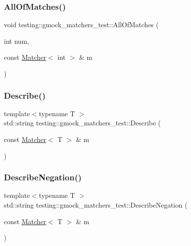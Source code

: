 \subsubsection{\texorpdfstring{AllOfMatches()}{AllOfMatches()}}
{\footnotesize\ttfamily void testing\+::gmock\+\_\+matchers\+\_\+test\+::\+All\+Of\+Matches (\begin{DoxyParamCaption}\item[{int}]{num,  }\item[{const \mbox{\hyperlink{classtesting_1_1_matcher}{Matcher}}$<$ int $>$ \&}]{m }\end{DoxyParamCaption})}

\mbox{\label{namespacetesting_1_1gmock__matchers__test_a738a538e1705ea49670aeb3ed25108e6}} 
\subsubsection{\texorpdfstring{Describe()}{Describe()}}
{\footnotesize\ttfamily template$<$typename T $>$ \\
std\+::string testing\+::gmock\+\_\+matchers\+\_\+test\+::\+Describe (\begin{DoxyParamCaption}\item[{const \mbox{\hyperlink{classtesting_1_1_matcher}{Matcher}}$<$ T $>$ \&}]{m }\end{DoxyParamCaption})}

\mbox{\label{namespacetesting_1_1gmock__matchers__test_a96c18b92dede79060a7303fe5d178faf}} 
\subsubsection{\texorpdfstring{DescribeNegation()}{DescribeNegation()}}
{\footnotesize\ttfamily template$<$typename T $>$ \\
std\+::string testing\+::gmock\+\_\+matchers\+\_\+test\+::\+Describe\+Negation (\begin{DoxyParamCaption}\item[{const \mbox{\hyperlink{classtesting_1_1_matcher}{Matcher}}$<$ T $>$ \&}]{m }\end{DoxyParamCaption})}


